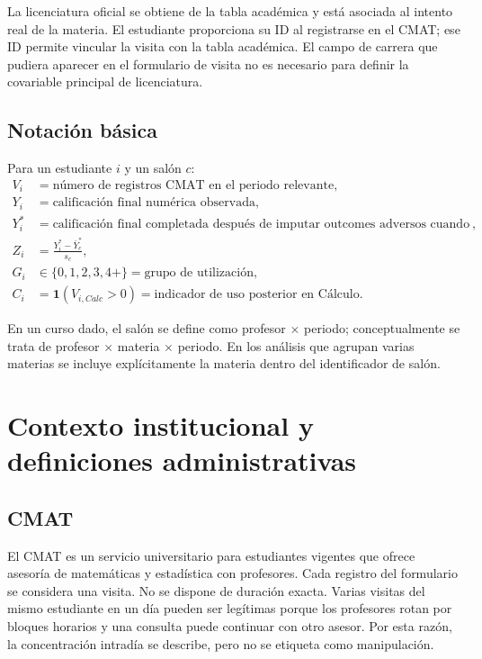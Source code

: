 \documentclass[11pt,letterpaper]{article}
\begin{document}
La licenciatura oficial se obtiene de la tabla académica y está asociada al intento real de la materia. El estudiante proporciona su ID al registrarse en el CMAT; ese ID permite vincular la visita con la tabla académica. El campo de carrera que pudiera aparecer en el formulario de visita no es necesario para definir la covariable principal de licenciatura.

\subsection{Notación básica}

Para un estudiante $i$ y un salón $c$:
\begin{align*}
V_i &= \text{número de registros CMAT en el periodo relevante},\\
Y_i &= \text{calificación final numérica observada},\\
Y_i^* &= \text{calificación final completada después de imputar outcomes adversos cuando procede},\\
Z_i &= \frac{Y_i^*-\bar Y_c^*}{s_c},\\
G_i &\in \{0,1,2,3,4+\}=\text{grupo de utilización},\\
C_i &= \mathbf 1(V_{i,Calc}>0)=\text{indicador de uso posterior en Cálculo}.
\end{align*}

En un curso dado, el salón se define como profesor $\times$ periodo; conceptualmente se trata de profesor $\times$ materia $\times$ periodo. En los análisis que agrupan varias materias se incluye explícitamente la materia dentro del identificador de salón.

\section{Contexto institucional y definiciones administrativas}

\subsection{CMAT}

El CMAT es un servicio universitario para estudiantes vigentes que ofrece asesoría de matemáticas y estadística con profesores. Cada registro del formulario se considera una visita. No se dispone de duración exacta. Varias visitas del mismo estudiante en un día pueden ser legítimas porque los profesores rotan por bloques horarios y una consulta puede continuar con otro asesor. Por esta razón, la concentración intradía se describe, pero no se etiqueta como manipulación.
\end{document}
